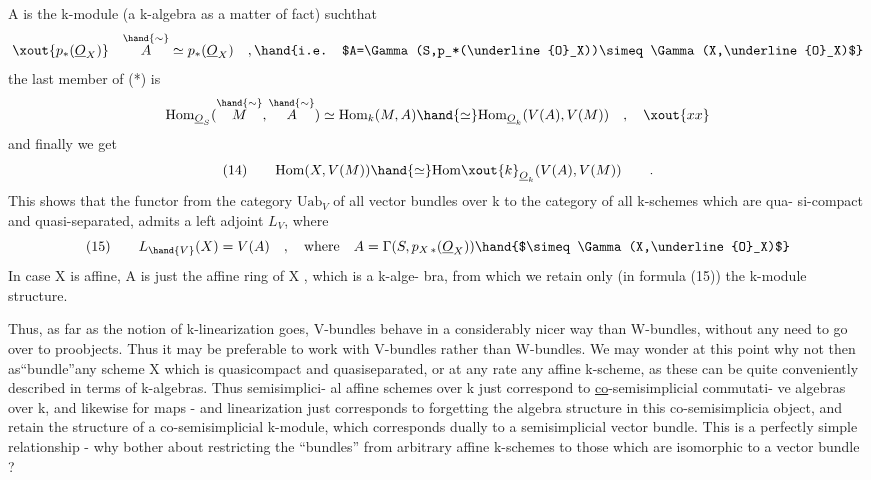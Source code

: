 
A is the  k-module (a k-algebra as a matter of fact) suchthat
\[ \xout{p_*(\underline{O}_X)} \quad \overset{\hand{\sim}}{A} \simeq p_*(\underline{O}_X) \quad , \hand{i.e. $A=\Gamma(S,p_*(\underline{O}_X))\simeq\Gamma(X,\underline{O}_X)$} \]
the last member of (*) is
\[ \mathrm{Hom}_{\underline{O}_S}(\overset{\hand{\sim}}{M} , \overset{\hand{\sim}}{A}) \simeq \mathrm{Hom}_k(M,A) \hand{\simeq} \mathrm{Hom}_{\underline{O}_k}(V(A), V(M)) \quad , \quad \xout{xx} \]
and finally we get
\[ (14) \qquad \mathrm{Hom}(X,V(M)) \hand{\simeq} \mathrm{Hom}\xout{k}_{\underline{O}_k}(V(A),V(M)) \qquad . \]
This shows that the  functor from the category $\mathrm{Uab}_V$ of all
vector bundles over k to the category of all  k-schemes which are qua-%
si-compact and quasi-separated, admits a left adjoint $L_V$, where
\[ (15) \qquad L_{\hand{V}}(X) = V(A) \quad , \quad \text{where} \quad A = \Gamma(S, p_{X\,*}(\underline{O}_X)) \hand{$\simeq \Gamma(X,\underline{O}_X)$} \]
In case X is affine, A is just the affine ring of X , which is a k-alge-%
bra, from which we retain only (in formula (15)) the k-module structure.

Thus, as far as the notion of k-linearization goes, V-bundles
behave in a considerably nicer way than W-bundles, without any need to
go over to proobjects.  Thus it may be preferable to
work with V-bundles rather than W-bundles. We may wonder at this point
why not  then as``bundle''any scheme X which is quasicompact and
quasiseparated, or at any rate any affine k-scheme, as these can be
quite conveniently described in terms of k-algebras. Thus\hand{,} semisimplici-%
al affine schemes over k just correspond to \uline{co}-semisimplicial commutati-%
ve algebras over k, and likewise for maps - and linearization just
corresponds to forgetting the algebra structure in this co-semisimplicia
object, and retain the structure of a co-semisimplicial k-module,
which corresponds dually to a semisimplicial vector bundle. This is
a perfectly simple relationship - why bother about restricting the
``bundles'' from arbitrary affine k-schemes to those which are isomorphic
to a vector bundle ?

